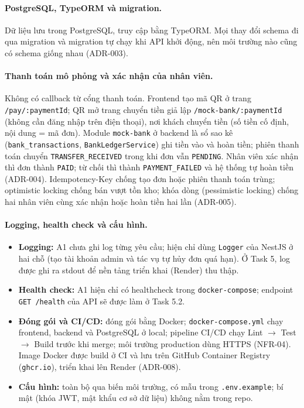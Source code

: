 \paragraph{PostgreSQL, TypeORM và migration.}

Dữ liệu lưu trong PostgreSQL, truy cập bằng TypeORM. Mọi thay đổi schema đi qua migration và migration tự chạy khi API khởi động, nên môi trường nào cũng có schema giống nhau (ADR-003).

\paragraph{Thanh toán mô phỏng và xác nhận của nhân viên.}

Không có callback từ cổng thanh toán. Frontend tạo mã QR ở trang \texttt{/pay/:paymentId}; QR mở trang chuyển tiền giả lập \texttt{/mock-bank/:paymentId} (không cần đăng nhập trên điện thoại), nơi khách chuyển tiền (số tiền cố định, nội dung = mã đơn). Module \texttt{mock-bank} ở backend là sổ sao kê (\texttt{bank\_transactions}, \texttt{BankLedgerService}) ghi tiền vào và hoàn tiền; phiên thanh toán chuyển \texttt{TRANSFER\_RECEIVED} trong khi đơn vẫn \texttt{PENDING}. Nhân viên xác nhận thì đơn thành \texttt{PAID}; từ chối thì thành \texttt{PAYMENT\_FAILED} và hệ thống tự hoàn tiền (ADR-004). Idempotency-Key chống tạo đơn hoặc phiên thanh toán trùng; optimistic locking chống bán vượt tồn kho; khóa dòng (pessimistic locking) chống hai nhân viên cùng xác nhận hoặc hoàn tiền hai lần (ADR-005).

\paragraph{Logging, health check và cấu hình.}

\begin{itemize}
  \item \textbf{Logging:} A1 chưa ghi log từng yêu cầu; hiện chỉ dùng \texttt{Logger} của NestJS ở hai chỗ (tạo tài khoản admin và tác vụ tự hủy đơn quá hạn). Ở Task 5, log được ghi ra stdout để nền tảng triển khai (Render) thu thập.
  \item \textbf{Health check:} A1 hiện chỉ có healthcheck trong \texttt{docker-compose}; endpoint \texttt{GET /health} của API sẽ được làm ở Task 5.2.
  \item \textbf{Đóng gói và CI/CD:} đóng gói bằng Docker; \texttt{docker-compose.yml} chạy frontend, backend và PostgreSQL ở local; pipeline CI/CD chạy Lint $\rightarrow$ Test $\rightarrow$ Build trước khi merge; môi trường production dùng HTTPS (NFR-04). Image Docker được build ở CI và lưu trên GitHub Container Registry (\texttt{ghcr.io}), triển khai lên Render (ADR-008).
  \item \textbf{Cấu hình:} toàn bộ qua biến môi trường, có mẫu trong \texttt{.env.example}; bí mật (khóa JWT, mật khẩu cơ sở dữ liệu) không nằm trong repo.
\end{itemize}


